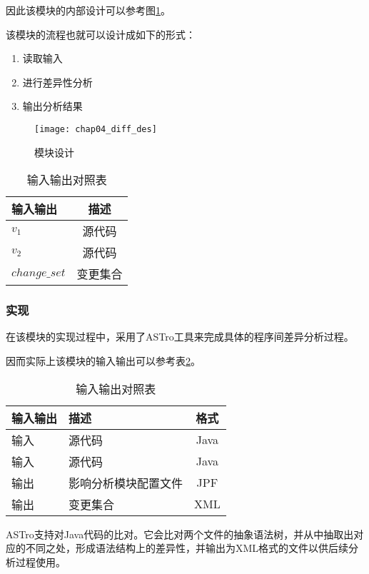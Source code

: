 因此该模块的内部设计可以参考图\ref {des_diff}。

该模块的流程也就可以设计成如下的形式：
\begin{enumerate}
	\item 读取输入
	\item 进行差异性分析
	\item 输出分析结果
\end{enumerate}

\begin{figure}[H]
	\centering
	\texttt{[image: chap04\_diff\_des]}
	\caption {模块设计}
	\label {des_diff}	
\end{figure}


\begin{table}
	\caption{输入输出对照表}
	\label{differ_io}
	\centering
	\begin{tabular}{lc}
		\toprule[1.5pt]
		{\heiti 输入输出} & {\heiti 描述}\\\midrule[1pt]
		$v_1$ & 源代码 \\
		$v_2$ & 源代码 \\
		$change\_set$ & 变更集合 \\
		\bottomrule[1.5pt]
	\end{tabular}
\end{table}

\subsubsection{实现}

在该模块的实现过程中，采用了ASTro工具来完成具体的程序间差异分析过程。

因而实际上该模块的输入输出可以参考表\ref {differ_io2}。

\begin{table}
	\caption{输入输出对照表}
	\label{differ_io2}
	\centering
	\begin{tabular}{llc}
		\toprule[1.5pt]
		{\heiti 输入输出} & {\heiti 描述} & {\heiti 格式}\\\midrule[1pt]
		输入 & 源代码 & Java\\
		输入 & 源代码 & Java\\
		输出 & 影响分析模块配置文件 & JPF\\
		输出 & 变更集合 & XML\\
		\bottomrule[1.5pt]
	\end{tabular}
\end{table}

ASTro支持对Java代码的比对。它会比对两个文件的抽象语法树，并从中抽取出对应的不同之处，形成语法结构上的差异性，并输出为XML格式的文件以供后续分析过程使用。

